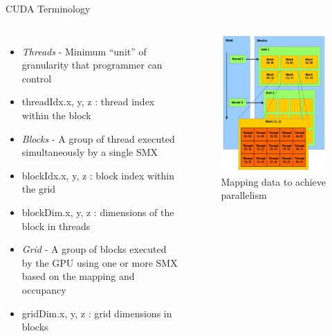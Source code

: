 \documentclass[10pt,times]{beamer}
\begin{document}
\begin{frame}{CUDA Terminology}
\begin{columns}
\begin{itemize}
\item \textit{Threads} - Minimum ``unit'' of granularity that programmer can control
\item threadIdx.{x, y, z} : thread index within the block
\item \textit{Blocks} - A group of thread executed simultaneously by a single SMX
\item blockIdx.{x, y, z} : block index within the grid
\item blockDim.{x, y, z} : dimensions of the block in threads
\item \textit{Grid} - A group of blocks executed by the GPU using one or more SMX 
based on the mapping and occupancy
\item gridDim.{x, y, z} :  grid dimensions in blocks

\end{itemize}
\begin{figure}
\includegraphics[width=\linewidth]{figs/CUDA_mapping}
\caption*{Mapping data to achieve parallelism}
\end{figure}
\end{columns}
\end{frame}
\end{document}
